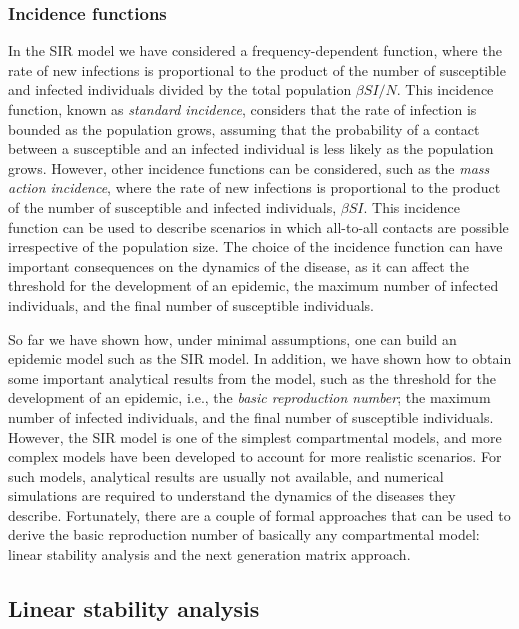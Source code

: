 \subsubsection*{Incidence functions}
In the SIR model we have considered a frequency-dependent function, where the
rate of new infections is proportional to the product of the number of
susceptible and infected individuals divided by the total population $\beta
  SI/N$. This incidence function, known as \textit{standard incidence},
considers that the rate of infection is bounded as the population grows,
assuming that the probability of a contact between a susceptible and an
infected individual is less likely as the population grows. However, other
incidence functions can be considered, such as the \textit{mass action
  incidence}, where the rate of new infections is proportional to the product
of the number of susceptible and infected individuals, $\beta SI$. This
incidence function can be used to describe scenarios in which all-to-all
contacts are possible irrespective of the population size. The choice of the
incidence function can have important consequences on the dynamics of the
disease, as it can affect the threshold for the development of an epidemic, the
maximum number of infected individuals, and the final number of susceptible
individuals.

So far we have shown how, under minimal assumptions, one can build an epidemic
model such as the SIR model. In addition, we have shown how to obtain some
important analytical results from the model, such as the threshold for the
development of an epidemic, i.e., the \textit{basic reproduction number}; the
maximum number of infected individuals, and the final number of susceptible
individuals. However, the SIR model is one of the simplest compartmental
models, and more complex models have been developed to account for more
realistic scenarios. For such models, analytical results are usually not
available, and numerical simulations are required to understand the dynamics of
the diseases they describe. Fortunately, there are a couple of formal
approaches that can be used to derive the basic reproduction number of
basically any compartmental model: linear stability analysis and the next
generation matrix approach.

\subsection{Linear stability analysis}

